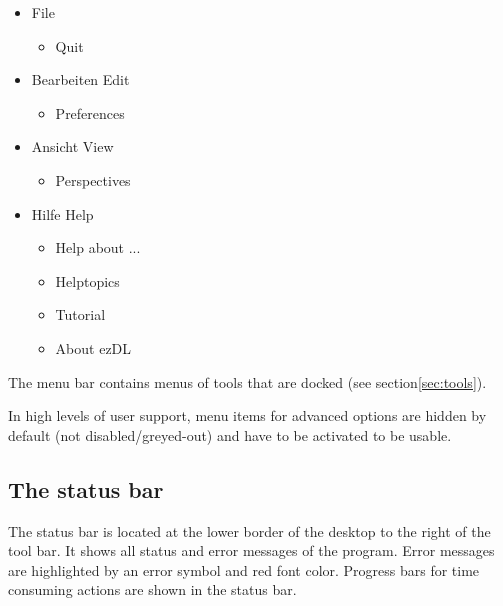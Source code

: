 \documentclass[12pt]{book}
\begin{document}
\begin{itemize}
\item File
	\begin{itemize}
	\item Quit
	\end{itemize}
\item Bearbeiten Edit
	\begin{itemize}
	\item Preferences
	\end{itemize}
\item Ansicht View
	\begin{itemize}
	\item Perspectives
	\end{itemize}
\item Hilfe Help
	\begin{itemize}
	\item Help about ...
	\item Helptopics
	\item Tutorial
	\item About ezDL
	\end{itemize}
\end{itemize}

The menu bar contains menus of tools that are docked (see section\ref{sec:tools}).


In high levels of user support, menu items for advanced options are hidden by default (not disabled/greyed-out) and have to be activated to be usable.

\subsection{The status bar}

The status bar is located at the lower border of the desktop to the right of the tool bar. It shows all status and error messages of the program. Error messages are highlighted by an error symbol and red font color. Progress bars for time consuming actions are shown in the status bar.

\end{document}
